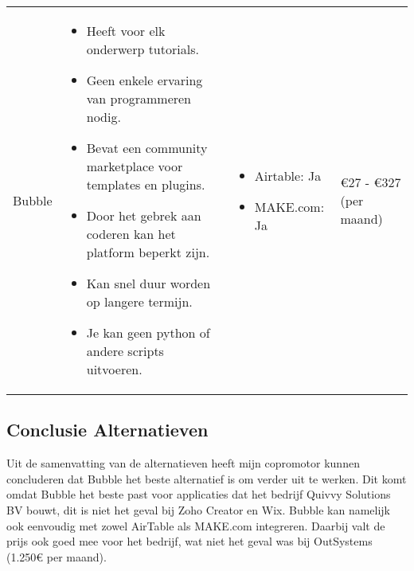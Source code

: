\begin{longtable}{p{2.5cm} p{5.5cm} p{3.5cm} p{2.5cm}}
    Bubble & 
    \vspace{-\topsep}\vspace{-\partopsep} 
    \begin{itemize}[leftmargin=2pt, topsep=0pt,parsep=0pt,noitemsep]
        \item[] Heeft voor elk onderwerp tutorials.
        \item[] Geen enkele ervaring van programmeren nodig.
        \item[] Bevat een community marketplace voor templates en plugins.
    \end{itemize}
    \begin{itemize}[leftmargin=2pt, topsep=8pt,parsep=0pt,noitemsep]
        \item[] Door het gebrek aan coderen kan het platform beperkt zijn.
        \item[] Kan snel duur worden op langere termijn.
        \item[] Je kan geen python of andere scripts uitvoeren.
    \end{itemize} &
    \vspace{-\topsep}\vspace{-\partopsep} 
    \begin{itemize}[leftmargin=2pt, topsep=0pt,parsep=0pt,noitemsep]
        \item[]  Airtable: Ja
        \item[]  MAKE.com: Ja
    \end{itemize}
    &
    €27 - €327 (per maand)\\
\end{longtable}
\subsection{Conclusie Alternatieven}%
\label{subsec:conclusie-alternatieven}
Uit de samenvatting van de alternatieven heeft mijn copromotor kunnen concluderen dat Bubble het beste alternatief is om verder uit te werken.
Dit komt omdat Bubble het beste past voor applicaties dat het bedrijf Quivvy Solutions BV bouwt, dit is niet het geval bij Zoho Creator en Wix. 
Bubble kan namelijk ook eenvoudig met zowel AirTable als MAKE.com integreren. Daarbij valt de prijs ook goed mee voor het bedrijf, wat niet het geval was bij OutSystems (1.250€ per maand).
